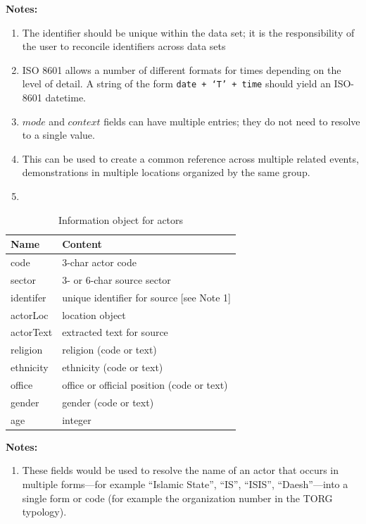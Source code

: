 \documentclass[11pt]{report}
\begin{document}
\noindent \textbf{Notes:}
\begin{enumerate}
\item The identifier should be unique within the data set; it is the responsibility of the user to reconcile identifiers across data sets
\item ISO 8601 allows a number of different formats for times depending on the level of detail. A string of the form \texttt{date + `T' + time} should yield an ISO-8601 datetime.
\item  $mode$ and $context$ fields can have multiple entries; they do not need to resolve to a single value.
\item  This can be used to create a common reference across multiple related events, demonstrations in multiple locations organized by the same group.
\item \color{red}{PTB Question: Should there also be lat and lon for any geolocation of the eventLoc?} \color{blue}{PAS: eventLoc has that inside the location object}
\end{enumerate}


\clearpage


\begin{table}[htp]
\caption{Information object for actors }
\begin{center}
\begin{tabular}{|l|l|}
\hline
Name & Content \\
\hline
code & 3-char actor code \\
sector & 3- or 6-char source sector \\
identifer & unique identifier for source [see Note 1]\\
actorLoc & location object\\
actorText & extracted text for source \\
religion & religion (code or text) \\
ethnicity & ethnicity (code or text) \\
office & office or official position (code or text) \\
gender & gender (code or text) \\
age & integer \\
\hline
\end{tabular}
\end{center}
\label{tab:actorinfo}
\noindent \textbf{Notes:}
\begin{enumerate}
\item These fields would be used to resolve the name of an actor that occurs in multiple forms---for example ``Islamic State'', ``IS'', ``ISIS'', ``Daesh''---into a single form or code (for example the organization number in the TORG typology).  \color{red}{PTB: Need to resolve to a link for TORG.}
\end{enumerate}
\end{table}%
\end{document}

